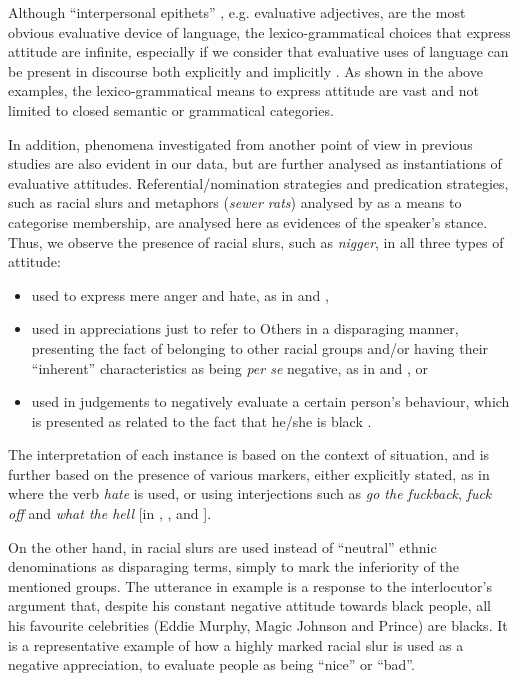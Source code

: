 \documentclass[output=paper]{LSP/langsci}
\begin{document}
Although “interpersonal epithets” \citep[see][376-377]{Halliday2014}, e.g. evaluative adjectives, are the most obvious evaluative device of language, the lexico-grammatical choices that express attitude are infinite, especially if we consider that evaluative uses of language can be present in discourse both explicitly and implicitly \citep[see][23] {Munday2012}. As shown in the above examples, the lexico-grammatical means to express attitude are vast and not limited to closed semantic or grammatical categories.

In addition, phenomena investigated from another point of view in previous studies are also evident in our data, but are further analysed as instantiations of evaluative attitudes. Referential/nomination strategies and predication strategies, such as racial slurs and metaphors (\textit{sewer rats}) analysed by \citet{Reisigl2001} as a means to categorise membership, are analysed here as evidences of the speaker's stance. Thus, we observe the presence of racial slurs, such as \textit{nigger}, in all three types of attitude:

\begin{itemize}
\item used to express mere anger and hate, as in  and ,
\item used in appreciations just to refer to Others in a disparaging manner, presenting the fact of belonging to other racial groups and/or having their “inherent” characteristics as being \textit{per se} negative, as in  and , or
\item used in judgements to negatively evaluate a certain person's behaviour, which is presented as related to the fact that he/she is black .
\end{itemize}

The interpretation of each instance is based on the context of situation, and is further based on the presence of various markers, either explicitly stated, as in  where the verb \textit{hate} is used, or using interjections such as \textit{go the fuckback}, \textit{fuck off} and \textit{what the hell} [in , , and ].

On the other hand, in  racial slurs are used instead of “neutral” ethnic denominations as disparaging terms, simply to mark the inferiority of the mentioned groups. The utterance in example  is a response to the interlocutor's argument that, despite his constant negative attitude towards black people, all his favourite celebrities (Eddie Murphy, Magic Johnson and Prince) are blacks. It is a representative example of how a highly marked racial slur is used as a negative appreciation, to evaluate people as being “nice” or “bad”.
\end{document}
